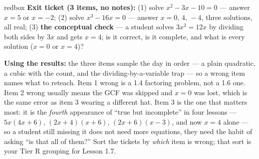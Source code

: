 \documentclass[10pt]{article}
\begin{document}
\begin{skillbox}{redbox}
\textbf{Exit ticket (3 items, no notes):} (1) solve $x^2-3x-10=0$ --- answer $x=5$ or $x=-2$;
(2) solve $x^3-16x=0$ --- answer $x=0, \, 4, \, -4$, three solutions, all real; (3) \textbf{the
conceptual check} --- a student solves $3x^2=12x$ by dividing both sides by $3x$ and gets $x=4$; is
it correct, is it complete, and what is every solution ($x=0$ or $x=4$)?

\textbf{Using the results:} the three items sample the day in order --- a plain quadratic, a cubic
with the count, and the dividing-by-a-variable trap --- so a wrong item names what to reteach. Item
1 wrong is a 1.4 factoring problem, not a 1.6 one. Item 2 wrong usually means the GCF was skipped
and $x=0$ was lost, which is the same error as item 3 wearing a different hat. Item 3 is the one
that matters most: it is the \emph{fourth} appearance of ``true but incomplete'' in four lessons ---
$5x(4x+6)$, $(2x+4)(x+6)$, $(2x+6)(x-3)$, and now $x=4$ alone --- so a student still missing it does
not need more equations, they need the habit of asking ``is that all of them?'' Sort the tickets by
\emph{which} item is wrong; that sort is your Tier R grouping for Lesson 1.7.
\end{skillbox}
\end{document}

